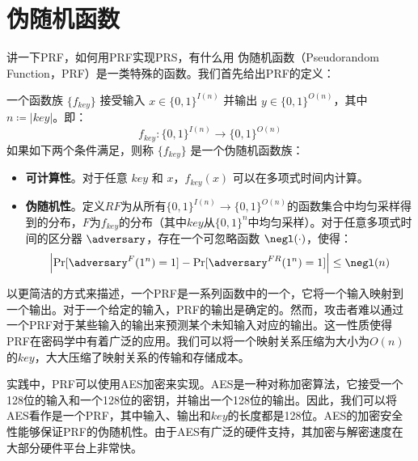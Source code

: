 \section{伪随机函数}
{讲一下PRF，如何用PRF实现PRS，有什么用}
伪随机函数（Pseudorandom Function，PRF）是一类特殊的函数。我们首先给出PRF的定义：
\begin{definition}[伪随机函数族]
    一个函数族 $\{f_{key}\}$ 接受输入 $x\in\{0,1\}^{I(n)}$ 并输出 $y\in\{0,1\}^{O(n)}$，其中 $n \coloneqq |key|$。即：
    $$ f_{key}: \{0,1\}^{I(n)} \rightarrow \{0,1\}^{O(n)}$$
    如果如下两个条件满足，则称 $\{f_{key}\}$ 是一个伪随机函数族：
    \begin{itemize}
        \item \textbf{可计算性}。对于任意 $key$ 和 $x$，$f_{key}(x)$ 可以在多项式时间内计算。
        \item \textbf{伪随机性}。定义$RF$为从所有$\{0,1\}^{I(n)} \rightarrow \{0,1\}^{O(n)}$的函数集合中均匀采样得到的分布，$F$为$f_{key}$的分布（其中$key$从$\{0,1\}^{n}$中均匀采样）。对于任意多项式时间的区分器 $\adversary$，存在一个可忽略函数 $\negl(\cdot)$，使得：
        $$\left| \Pr[\adversary^{F}(1^n) = 1] - \Pr[\adversary^{FR}(1^n) = 1] \right| \le \negl(n)$$
    \end{itemize}
\end{definition}

以更简洁的方式来描述，一个PRF是一系列函数中的一个，它将一个输入映射到一个输出。对于一个给定的输入，PRF的输出是确定的。然而，攻击者难以通过一个PRF对于某些输入的输出来预测某个未知输入对应的输出。这一性质使得PRF在密码学中有着广泛的应用。我们可以将一个映射关系压缩为大小为$O(n)$的$key$，大大压缩了映射关系的传输和存储成本。

实践中，PRF可以使用AES加密来实现。AES是一种对称加密算法，它接受一个128位的输入和一个128位的密钥，并输出一个128位的输出。因此，我们可以将AES看作是一个PRF，其中输入、输出和$key$的长度都是128位。AES的加密安全性能够保证PRF的伪随机性。由于AES有广泛的硬件支持，其加密与解密速度在大部分硬件平台上非常快。